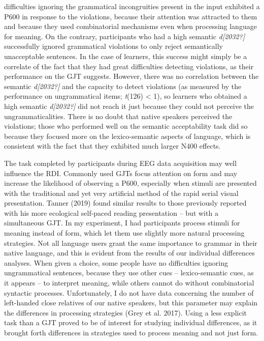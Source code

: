 \documentclass[11pt]{article}
\newenvironment{styleStandard}{\renewcommand\baselinestretch{1.0}\setlength\leftskip{0cm}\setlength\rightskip{0cm plus 1fil}\setlength\parindent{0cm}\setlength\parfillskip{0pt plus 1fil}\setlength\parskip{0in plus 1pt}\writerlistparindent\writerlistleftskip\leavevmode\normalfont\normalsize\writerlistlabel\ignorespaces}{\unskip\vspace{0.111in plus 0.0111in}\par}
\newcommand\writerlistleftskip{}
\newcommand\writerlistparindent{}
\newcommand\writerlistlabel{}
\begin{document}
\begin{styleStandard}
difficulties ignoring the grammatical incongruities present in the input exhibited a P600 in response to the violations, because their attention was attracted to them and because they used combinatorial mechanisms even when processing language for meaning. On the contrary, participants who had a high semantic \textit{d[2032?]} successfully ignored grammatical violations to only reject semantically unacceptable sentences. In the case of learners, this success might simply be a correlate of the fact that they had great difficulties detecting violations, as their performance on the GJT suggests. However, there was no correlation between the semantic \textit{d[2032?]} and the capacity to detect violations (as measured by the performance on ungrammatical items; \textit{t}(126) {\textless} 1), so learners who obtained a high semantic \textit{d[2032?]} did not reach it just because they could not perceive the ungrammaticalities. There is no doubt that native speakers perceived the violations; those who performed well on the semantic acceptability task did so because they focused more on the lexico-semantic aspects of language, which is consistent with the fact that they exhibited much larger N400 effects.
\end{styleStandard}

\begin{styleStandard}
The task completed by participants during EEG data acquisition may well influence the RDI. Commonly used GJTs focus attention on form and may increase the likelihood of observing a P600, especially when stimuli are presented with the traditional and yet very artificial method of the rapid serial visual presentation. Tanner (2019) found similar results to those previously reported with his more ecological self-paced reading presentation – but with a simultaneous GJT. In my experiment, I had participants process stimuli for meaning instead of form, which let them use slightly more natural processing strategies. Not all language users grant the same importance to grammar in their native language, and this is evident from the results of our individual differences analyses. When given a choice, some people have no difficulties ignoring ungrammatical sentences, because they use other cues – lexico-semantic cues, as it appears – to interpret meaning, while others cannot do without combinatorial syntactic processes. Unfortunately, I do not have data concerning the number of left-handed close relatives of our native speakers, but this parameter may explain the differences in processing strategies (Grey et al. 2017). Using a less explicit task than a GJT proved to be of interest for studying individual differences, as it brought forth differences in strategies used to process meaning and not just form. 
\end{styleStandard}
\end{document}
